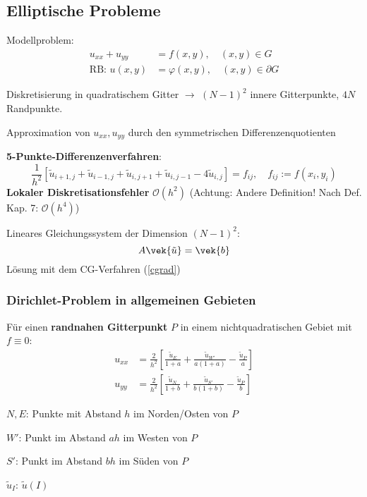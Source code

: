 	\subsection{Elliptische Probleme}
		Modellproblem:
		\begin{align*}
			u_{xx} + u_{yy} &= f(x,y),\quad (x,y) \in G \\
			\text{RB: } u(x,y) &= \varphi(x,y),\quad (x,y) \in \partial G
		\end{align*}
		\begin{tightenumerate}
			\item Diskretisierung in quadratischem Gitter $\rightarrow$ $(N-1)^2$ innere Gitterpunkte, $4N$ Randpunkte. 
			\item Approximation von $u_{xx}, u_{yy}$ durch den symmetrischen Differenzenquotienten 
			\item \textbf{5-Punkte-Differenzenverfahren}:
				\[
					\frac{1}{h^2}\left[ \tilde u_{i+1,j} + \tilde u_{i-1,j} + \tilde u_{i,j+1} + \tilde u_{i,j-1} - 4 \tilde u_{i,j}\right] = f_{ij}, \quad f_{ij} := f(x_i,y_i)
				\]
				\textbf{Lokaler Diskretisationsfehler} $\mathcal{O}(h^2)$ (Achtung: Andere Definition! Nach Def. Kap. 7: $\mathcal{O}(h^4)$)
			\item Lineares Gleichungssystem der Dimension $(N-1)^2$:
				\[
					A \vek{\tilde u} = \vek{b}
				\]
				Lösung mit dem CG-Verfahren (\ref{cgrad})
		\end{tightenumerate}
		
		\subsubsection{Dirichlet-Problem in allgemeinen Gebieten}
			Für einen \textbf{randnahen Gitterpunkt} $P$ in einem nichtquadratischen Gebiet mit $f \equiv 0$:
			\begin{align*}
				u_{xx} &= \frac{2}{h^2}\left[ \frac{\tilde u_E}{1+a} + \frac{\tilde u_{W'}}{a(1+a)} - \frac{\tilde u_P}{a} \right] \\
				u_{yy} &= \frac{2}{h^2}\left[ \frac{\tilde u_N}{1+b} + \frac{\tilde u_{S'}}{b(1+b)} - \frac{\tilde u_P}{b} \right]
			\end{align*}
			\begin{tightitemize}
				\item[$N,E$:] Punkte mit Abstand $h$ im Norden/Osten von $P$
				\item[$W'$:] Punkt im Abstand $ah$ im Westen von $P$
				\item[$S'$:] Punkt im Abstand $bh$ im Süden von $P$
				\item[$\tilde u_I$:] $\tilde u (I)$
			\end{tightitemize}

